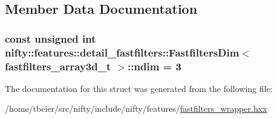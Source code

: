 \subsection{Member Data Documentation}
\hypertarget{structnifty_1_1features_1_1detail__fastfilters_1_1FastfiltersDim_3_01fastfilters__array3d__t_01_4_ade1a9611314dfe152d2cab3cab55e473}{}
\subsubsection[{ndim}]{\setlength{\rightskip}{0pt plus 5cm}const unsigned int {\bf nifty\+::features\+::detail\+\_\+fastfilters\+::\+Fastfilters\+Dim}$<$ fastfilters\+\_\+array3d\+\_\+t $>$\+::ndim = 3\hspace{0.3cm}{\ttfamily [static]}}\label{structnifty_1_1features_1_1detail__fastfilters_1_1FastfiltersDim_3_01fastfilters__array3d__t_01_4_ade1a9611314dfe152d2cab3cab55e473}


The documentation for this struct was generated from the following file\+:\begin{DoxyCompactItemize}
\item 
/home/tbeier/src/nifty/include/nifty/features/\hyperlink{fastfilters__wrapper_8hxx}{fastfilters\+\_\+wrapper.\+hxx}\end{DoxyCompactItemize}
